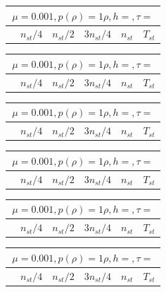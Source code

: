 \documentclass[12pt,a4paper]{article}
\begin{document}
\begin{tabular}{*{6}{|l}|}
    \hline
     \\
    \hline
    &$n_{st}/4 $&$ n_{st}/2$&$3n_{st}/4$&$n_{st}$&$T_{st}$ \\
    \hline
\end{tabular}

\begin{tabular}{*{6}{|l}|}
    \hline
     \\
    \hline
    &$n_{st}/4 $&$ n_{st}/2$&$3n_{st}/4$&$n_{st}$&$T_{st}$ \\
    \hline
\end{tabular}

\begin{tabular}{*{6}{|l}|}
    \hline
     \\
    \hline
    &$n_{st}/4 $&$ n_{st}/2$&$3n_{st}/4$&$n_{st}$&$T_{st}$ \\
    \hline
\end{tabular}

\begin{tabular}{*{6}{|l}|}
    \hline
     \\
    \hline
    &$n_{st}/4 $&$ n_{st}/2$&$3n_{st}/4$&$n_{st}$&$T_{st}$ \\
    \hline
\end{tabular}

\begin{tabular}{*{6}{|l}|}
    \hline
     \\
    \hline
    &$n_{st}/4 $&$ n_{st}/2$&$3n_{st}/4$&$n_{st}$&$T_{st}$ \\
    \hline
\end{tabular}

\begin{tabular}{*{6}{|l}|}
    \hline
     \\
    \hline
    &$n_{st}/4 $&$ n_{st}/2$&$3n_{st}/4$&$n_{st}$&$T_{st}$ \\
    \hline
\end{tabular}
\end{document}
